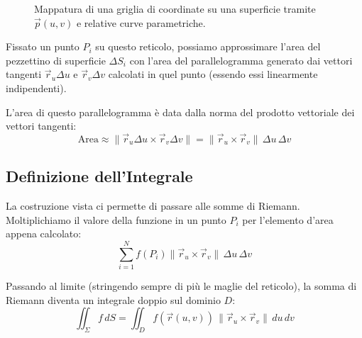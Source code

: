 \begin{figure}[H]
    \caption{Mappatura di una griglia di coordinate su una superficie tramite $\vec{p}(u,v)$ e relative curve parametriche.}
\end{figure}

Fissato un punto $P_i$ su questo reticolo, possiamo approssimare l'area del pezzettino di superficie $\Delta S_i$ con l'area del parallelogramma generato dai vettori tangenti $\vec{r}_u \Delta u$ e $\vec{r}_v \Delta v$ calcolati in quel punto (essendo essi linearmente indipendenti). 

L'area di questo parallelogramma è data dalla norma del prodotto vettoriale dei vettori tangenti:
\begin{equation}
    \text{Area} \approx \| \vec{r}_u \Delta u \times \vec{r}_v \Delta v \| = \| \vec{r}_u \times \vec{r}_v \| \, \Delta u \, \Delta v
\end{equation}

\subsection{Definizione dell'Integrale}
La costruzione vista ci permette di passare alle somme di Riemann. Moltiplichiamo il valore della funzione in un punto $P_i$ per l'elemento d'area appena calcolato:
$$ \sum_{i=1}^N f(P_i) \| \vec{r}_u \times \vec{r}_v \| \, \Delta u \, \Delta v $$

Passando al limite (stringendo sempre di più le maglie del reticolo), la somma di Riemann diventa un integrale doppio sul dominio $D$:
\begin{equation}
    \iint_{\Sigma} f \, dS = \iint_{D} f(\vec{r}(u,v)) \, \| \vec{r}_u \times \vec{r}_v \| \, du \, dv
\end{equation}

